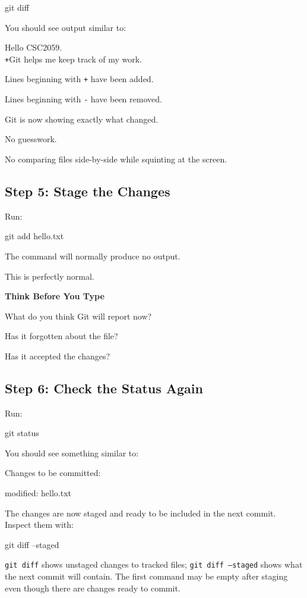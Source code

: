 \documentclass{csc2059practical}
\newcommand{\gitplus}{\textcolor{GitGreen}{\texttt{+}}}
\newcommand{\gitminus}{\textcolor{GitRed}{\texttt{-}}}
\begin{document}
\begin{terminalplain}
git diff
\end{terminalplain}
You should see output similar to:

\begin{terminalplain}
 Hello CSC2059.\\
\gitplus{}\textcolor{GitGreen}{Git helps me keep track of my work.}
\end{terminalplain}

Lines beginning with \gitplus{} have been added.

Lines beginning with \gitminus{} have been removed.

Git is now showing exactly what changed.

No guesswork.

No comparing files side-by-side while squinting at the screen.

\subsection{Step 5: Stage the Changes}
Run:

\begin{terminalplain}
git add hello.txt
\end{terminalplain}
The command will normally produce no output.

This is perfectly normal.

\begin{reflectionbox}
\textbf{Think Before You Type}\par
\medskip
What do you think Git will report now?

Has it forgotten about the file?

Has it accepted the changes?
\end{reflectionbox}
\subsection{Step 6: Check the Status Again}
Run:

\begin{terminalplain}
git status
\end{terminalplain}
You should see something similar to:

\begin{terminalplain}
Changes to be committed:

\hspace{1cm}\textcolor{GitGreen}{modified: hello.txt}
\end{terminalplain}
The changes are now staged and ready to be included in the next commit. Inspect them with:
\begin{bashcode}
git diff --staged
\end{bashcode}
\texttt{git diff} shows unstaged changes to tracked files; \texttt{git diff --staged} shows what the next commit will contain. The first command may be empty after staging even though there are changes ready to commit.
\end{document}
